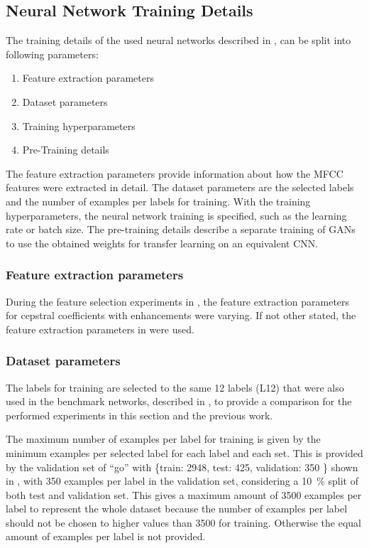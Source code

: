 
\subsection{Neural Network Training Details}\label{sec:exp_details_training}
The training details of the used neural networks described in , can be split into following parameters:
\begin{enumerate}
  \item Feature extraction parameters
  \item Dataset parameters
  \item Training hyperparameters
  \item Pre-Training details
\end{enumerate}
The feature extraction parameters provide information about how the MFCC features were extracted in detail.
The dataset parameters are the selected labels and the number of examples per labels for training.
With the training hyperparameters, the neural network training is specified, such as the learning rate or batch size.
The pre-training details describe a separate training of GANs to use the obtained weights for transfer learning on an equivalent CNN.



\subsubsection{Feature extraction parameters}
During the feature selection experiments in , the feature extraction parameters for cepstral coefficients with enhancements were varying.
If not other stated, the feature extraction parameters in  were used.




\subsubsection{Dataset parameters}
The labels for training are selected to the same 12 labels (L12) that were also used in the benchmark networks, described in , to provide a comparison for the performed experiments in this section and the previous work.

The maximum number of examples per label for training is given by the minimum examples per selected label for each label and each set.
This is provided by the validation set of \enquote{go} with \{train: 2948, test: 425, validation: 350 \} shown in , with 350 examples per label in the validation set, considering a \SI{10}{\percent} split of both test and validation set.
This gives a maximum amount of 3500 examples per label to represent the whole dataset because the number of examples per label should not be chosen to higher values than 3500 for training.
Otherwise the equal amount of examples per label is not provided.

